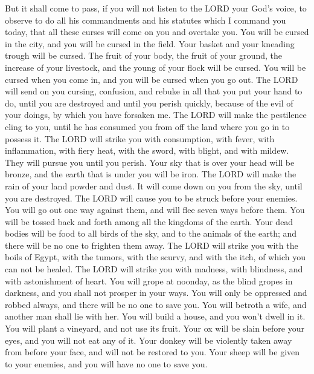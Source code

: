 \myverse{}But it shall come to pass, if you will not listen to the LORD
your God’s voice, to observe to do all his commandments and his statutes which I command you today, that
all these curses will come on you and overtake you.
\myverse{}You will be cursed in the city, and you will be cursed in the field.
\myverse{}Your basket and your kneading trough will be cursed.
\myverse{}The fruit of your body, the fruit of your ground, the increase of your livestock,
and the young of your flock will be cursed.
\myverse{}You will be cursed when you come in, and you will be cursed when you go out.
\myverse{}The LORD will send on you cursing, confusion, and rebuke in all that you
put your hand to do, until you are destroyed and until you perish quickly, because of the evil of your
doings, by which you have forsaken me.
\myverse{}The LORD will make the pestilence cling to you, until he has consumed you
from off the land where you go in to possess it.
\myverse{}The LORD will strike you with consumption, with fever, with inflammation,
with fiery heat, with the sword, with blight, and with mildew. They will pursue you until you perish.
\myverse{}Your sky that is over your head will be bronze, and the earth that is under
you will be iron.
\myverse{}The LORD will make the rain of your land powder and dust. It will come down
on you from the sky, until you are destroyed.
\myverse{}The LORD will cause you to be struck before your enemies. You will go out
one way against them, and will flee seven ways before them. You will be tossed back and forth among all
the kingdoms of the earth.
\myverse{}Your dead bodies will be food to all birds of the sky, and to the animals
of the earth; and there will be no one to frighten them away.
\myverse{}The LORD will strike you with the boils of Egypt, with the tumors, with the
scurvy, and with the itch, of which you can not be healed.
\myverse{}The LORD will strike you with madness, with blindness, and with astonishment
of heart.
\myverse{}You will grope at noonday, as the blind gropes in darkness, and you shall
not prosper in your ways. You will only be oppressed and robbed always, and there will be no one to save
you.
\myverse{}You will betroth a wife, and another man shall lie with her. You will build
a house, and you won’t dwell in it. You will plant a vineyard, and not use its fruit.
\myverse{}Your ox will be slain before your eyes, and you will not eat any of it. Your
donkey will be violently taken away from before your face, and will not be restored to you. Your sheep
will be given to your enemies, and you will have no one to save you.
